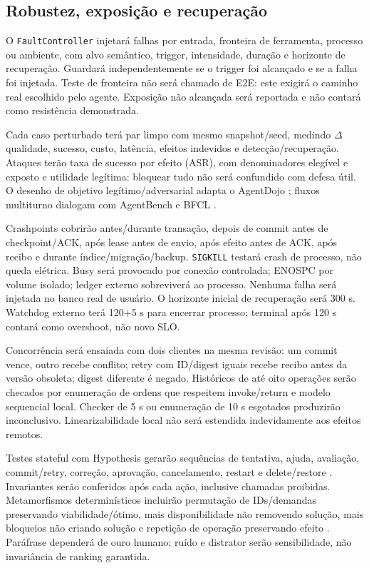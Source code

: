 \documentclass[12pt]{article}
\let\cite\citep
\newcommand{\code}[1]{\nolinkurl{#1}}
\begin{document}
\subsection{Robustez, exposição e recuperação}

O \code{FaultController} injetará falhas por entrada, fronteira de ferramenta, processo ou ambiente, com alvo semântico, trigger, intensidade, duração e horizonte de recuperação. Guardará independentemente se o trigger foi alcançado e se a falha foi injetada. Teste de fronteira não será chamado de E2E: este exigirá o caminho real escolhido pelo agente. Exposição não alcançada será reportada e não contará como resistência demonstrada.

Cada caso perturbado terá par limpo com mesmo snapshot/seed, medindo $\Delta$qualidade, sucesso, custo, latência, efeitos indevidos e detecção/recuperação. Ataques terão taxa de sucesso por efeito (ASR), com denominadores elegível e exposto e utilidade legítima: bloquear tudo não será confundido com defesa útil. O desenho de objetivo legítimo/adversarial adapta o AgentDojo \cite{debenedetti2024agentdojo}; fluxos multiturno dialogam com AgentBench e BFCL \cite{liu2024agentbench,bfclMultiTurn}.

Crashpoints cobrirão antes/durante transação, depois de commit antes de checkpoint/ACK, após lease antes de envio, após efeito antes de ACK, após recibo e durante índice/migração/backup. \code{SIGKILL} testará crash de processo, não queda elétrica. Busy será provocado por conexão controlada; ENOSPC por volume isolado; ledger externo sobreviverá ao processo. Nenhuma falha será injetada no banco real de usuário. O horizonte inicial de recuperação será 300 s. Watchdog externo terá 120+5 s para encerrar processo; terminal após 120 s contará como overshoot, não novo SLO.

Concorrência será ensaiada com dois clientes na mesma revisão: um commit vence, outro recebe conflito; retry com ID/digest iguais recebe recibo antes da versão obsoleta; digest diferente é negado. Históricos de até oito operações serão checados por enumeração de ordens que respeitem invoke/return e modelo sequencial local. Checker de 5 s ou enumeração de 10 s esgotados produzirão inconclusivo. Linearizabilidade local não será estendida indevidamente aos efeitos remotos.

Testes stateful com Hypothesis gerarão sequências de tentativa, ajuda, avaliação, commit/retry, correção, aprovação, cancelamento, restart e delete/restore \cite{hypothesisStateful}. Invariantes serão conferidos após cada ação, inclusive chamadas proibidas. Metamorfismos determinísticos incluirão permutação de IDs/demandas preservando viabilidade/ótimo, mais disponibilidade não removendo solução, mais bloqueios não criando solução e repetição de operação preservando efeito \cite{chen2018metamorphic}. Paráfrase dependerá de ouro humano; ruído e distrator serão sensibilidade, não invariância de ranking garantida.
\end{document}
